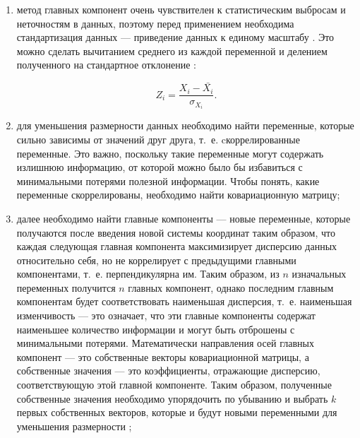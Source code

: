 \begin{enumerate}
	\item метод главных компонент очень чувствителен к статистическим выбросам и неточностям в данных, поэтому перед применением необходима стандартизация данных --- приведение данных к единому масштабу \cite{polyak, zakaria}. Это можно сделать вычитанием среднего из каждой переменной и делением полученного на стандартное отклонение \cite{zakaria}:
	
	\begin{equation}\label{eq:normalization_Z1}
		Z_i = \frac{{X_i - \bar{X_i}}}{{\sigma_{X_i}}}.
	\end{equation}
	\item для уменьшения размерности данных необходимо найти переменные, которые сильно зависимы от значений друг друга, т.~е. cкоррелированные переменные. Это важно, поскольку такие переменные могут содержать излишнюю информацию, от которой можно было бы избавиться с минимальными потерями полезной информации. Чтобы понять, какие переменные скоррелированы, необходимо найти ковариационную матрицу;
	\item далее необходимо найти главные компоненты --- новые переменные, которые получаются после введения новой системы координат таким образом, что каждая следующая главная компонента максимизирует дисперсию данных относительно себя, но не коррелирует с предыдущими главными компонентами, т.~е. перпендикулярна им. Таким образом, из $n$ изначальных переменных получится $n$ главных компонент, однако последним главным компонентам будет соответствовать наименьшая дисперсия, т.~е. наименьшая изменчивость --- это означает, что эти главные компоненты содержат наименьшее количество информации и могут быть отброшены с минимальными потерями. Математически направления осей главных компонент --- это собственные векторы ковариационной матрицы, а собственные значения --- это коэффициенты, отражающие дисперсию, соответствующую этой главной компоненте. Таким образом, полученные собственные значения необходимо упорядочить по убыванию и выбрать $k$ первых собственных векторов, которые и будут новыми переменными для уменьшения размерности \cite{orlov, polyak, zakaria};
	

\end{enumerate}
